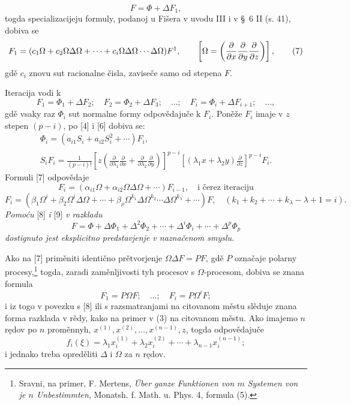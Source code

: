 \documentclass[11pt]{article}
\providecommand{\p}{\partial}
\begin{document}
\begin{equation}
        F=\Phi+\Delta F_1,
\tag{2a}
\end{equation}
togda specializacijeju formuly, podanoj u Fišera v uvodu III i v \S~6 II (s. 41), dobiva se
\begin{equation}
        F_1=(c_1\Omega+c_2\Omega\Delta\Omega+\cdots+c_i\Omega\Delta\Omega\cdots\Delta\Omega)F\footnotemark,
        \qquad \left[\Omega=\left(\frac{\p}{\p x}\frac{\p}{\p y}\frac{\p}{\p z}\right)\right],
\tag{7}
\end{equation}
gdě \(c_i\) znovu sut racionalne čisla, zaviseče samo od stepena \(F\).

Iteracija vodi k
\[
        F_1=\Phi_1+\Delta F_2;\quad F_2=\Phi_2+\Delta F_3;\quad\ldots;\quad
        F_i=\Phi_i+\Delta F_{i+1};\quad\ldots,
\]
gdě vsaky raz \(\Phi_i\) sut normalne formy odpovědajuče k \(F_i\). Poněže \(F_i\) imaje v \(z\) stepen \((p-i)\), po [4] i [6] dobiva se:
\begin{equation}
\begin{gathered}
        \Phi_i=(a_{i1}S_i+a_{i2}S_i^2+\cdots)F_i,\\
        S_iF_i=\frac1{(p-i)!}
        \left[z\left(\frac{\p}{\p\lambda_1}\frac{\p}{\p x}+
        \frac{\p}{\p\lambda_2}\frac{\p}{\p y}\right)\right]^{p-i}
        \left[(\lambda_1x+\lambda_2y)\frac{\p}{\p z}\right]^{p-i}F_i.
\end{gathered}
\tag{8}
\end{equation}
Formuli [7] odpovědaje
\[
        F_i=(\alpha_{i1}\Omega+\alpha_{i2}\Omega\Delta\Omega+\cdots)F_{i-1},
        \quad\text{i čerez iteraciju}
\]
\begin{equation}
        F_i=(\beta_1\Omega^i+\beta_2\Omega^i\Delta\Omega+\cdots
        +\beta_\rho\Omega^{k_1}\Delta\Omega^{k_2}\cdots\Delta\Omega^{k_\lambda}+\cdots)F,
        \quad(k_1+k_2+\cdots+k_\lambda-\lambda+1=i).
\tag{9}
\end{equation}
{\itshape Pomoću} [8] {\itshape i} [9] {\itshape v razkladu}
\[
        F=\Phi+\Delta\Phi_1+\Delta^2\Phi_2+\cdots+\Delta^i\Phi_i+\cdots+\Delta^p\Phi_p
\]
{\itshape dostignuto jest eksplicitno predstavjenje v naznačenom smyslu.}

Ako na [7] priměniti identično prětvorjenje \(\Omega\Delta F=PF\), gdě \(P\) označaje polarny procesy,\footnote{Sravni, na primer, F. Mertens, \emph{Über ganze Funktionen von \(m\) Systemen von je \(n\) Unbestimmten}, Monatsh. f. Math. u. Phys. 4, formula (5).} togda, zaradi zaměnljivosti tyh procesov s \(\Omega\)-procesom, dobiva se znana formula
\[
        F_1=P\Omega F;\quad\ldots;\quad F_i=P\Omega^iF;
\]
i iz togo v povezku s [8] ili s razsmatranjami na citovanom městu slěduje znana forma razklada v rědy, kako na primer v (3) na citovanom městu. Ako imajemo \(n\) rędov po \(n\) proměnnyh, \(x^{(1)},x^{(2)},\ldots,x^{(n-1)},z\), togda odpovědajuče
\[
        f_i(\xi)=\lambda_1x_i^{(1)}+\lambda_2x_i^{(2)}+\cdots+\lambda_{n-1}x_i^{(n-1)};
\]
i jednako treba opreděliti \(\Delta\) i \(\Omega\) za \(n\) rędov.
\end{document}
